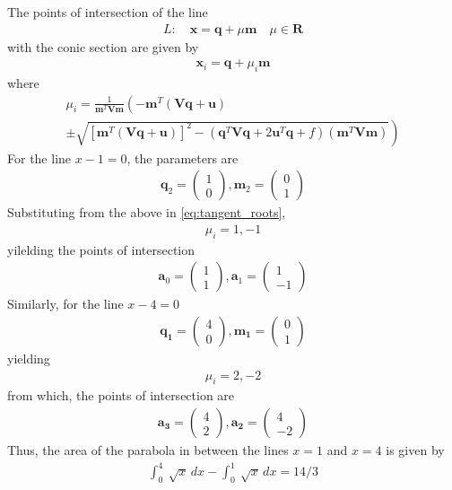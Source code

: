 \documentclass[journal,10pt,twocolumn]{article}
\let\vec\mathbf
\newcommand{\myvec}[1]{\ensuremath{\begin{pmatrix}#1\end{pmatrix}}}
\providecommand{\brak}[1]{\ensuremath{\left(#1\right)}}
\providecommand{\lbrak}[1]{\ensuremath{\left(#1\right.}}
\providecommand{\rbrak}[1]{\ensuremath{\left.#1\right)}}
\providecommand{\sbrak}[1]{\ensuremath{{}\left[#1\right]}}
\begin{document}
{The points of intersection of the line 
\begin{align}
	L: \quad \vec{x} = \vec{q} + \mu \vec{m} \quad \mu \in \mathbf{R}
\label{eq:conic_tangent}
\end{align}
with the conic section are given by
\begin{align}
\vec{x}_i = \vec{q} + \mu_i \vec{m}
\label{eq:conic_tangent_pts}
\end{align}
%
where
{\tiny
\begin{multline}
\mu_i = \frac{1}
{
\vec{m}^T\vec{V}\vec{m}
}
\lbrak{-\vec{m}^T\brak{\vec{V}\vec{q}+\vec{u}}}
\\
\pm
\rbrak{\sqrt{
\sbrak{
\vec{m}^T\brak{\vec{V}\vec{q}+\vec{u}}
}^2
-
\brak
{
\vec{q}^T\vec{V}\vec{q} + 2\vec{u}^T\vec{q} +f
}
\brak{\vec{m}^T\vec{V}\vec{m}}
}
}
\label{eq:tangent_roots}
\end{multline}
}
\fi
For the line $x-1=0$, the parameters are  
\begin{align}
	\vec{q}_2=\myvec{1\\0},
	\vec{m}_2=\myvec{0\\1}
\end{align}
Substituting from the above in 
\eqref{eq:tangent_roots},
\begin{align}
\mu_i=1,-1
\end{align}
yilelding 
the points of intersection 
\begin{align}
	\vec{a}_0=\myvec{1\\1},
	\vec{a}_1=\myvec{1\\-1}
\end{align}
Similarly, 
for the line $x-4=0$ 
\begin{align}
\vec{q_1}=\myvec{4\\0},
\vec{m_1}=\myvec{0\\1}
\end{align}
yielding
\begin{align}
\mu_i=2,-2
\end{align}
from which, the points of 
intersection are
\begin{align}
\vec{a_3}=\myvec{4\\2},
\vec{a_2}=\myvec{4\\-2}
\end{align}
Thus, 
the area of the parabola in between the lines $x=1$ and $x=4$ is given by
\begin{align}
\int_{0}^{4} \ \sqrt{x} \,dx-\int_{0}^{1} \ \sqrt{x} \,dx
=14/3
\end{align}
\iffalse


}
\end{document}
